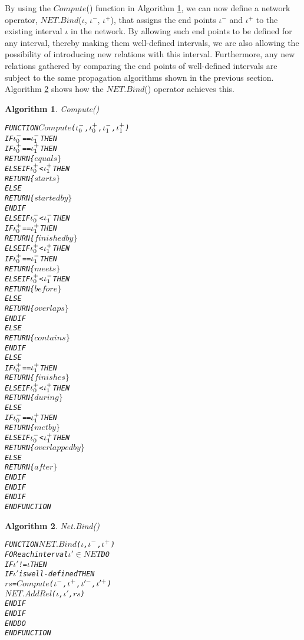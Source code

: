 \documentclass[11pt]{report}
\newenvironment{vverbatim}
{
  \begin{alltt}
}
{
    \vspace{-\baselineskip}
  \end{alltt}
}
\newtheorem{vvalgorithm}{Algorithm}[chapter]
\newenvironment{valgorithm}[2]
{
  \begin{vvalgorithm}{#1}
    \label{#2}
    \small
    \begin{vverbatim}
}
{
    \end{vverbatim}
  \end{vvalgorithm}
}
\begin{document}
        By using the $Compute$() function in Algorithm \ref{algo-tempo-compu},
        we can now define a network operator, $NET.Bind$($\iota$, $\iota^-$,
        $\iota^+$), that assigns the end points $\iota^-$ and $\iota^+$ to the
        existing interval $\iota$ in the network. By allowing such end points
        to be defined for any interval, thereby making them well-defined
        intervals, we are also allowing the possibility of introducing new
        relations with this interval. Furthermore, any new relations gathered
        by comparing the end points of well-defined intervals are subject to
        the same propagation algorithms shown in the previous section.
        Algorithm \ref{algo-tempo-ntbin} shows how the $NET.Bind$() operator
        achieves this.

        \begin{valgorithm}{Compute()}{algo-tempo-compu}
FUNCTION \(Compute\)(\(\iota\sb{0}\sp{-}\), \(\iota\sb{0}\sp{+}\), \(\iota\sb{1}\sp{-}\), \(\iota\sb{1}\sp{+}\))
  IF \(\iota\sb{0}\sp{-}\) == \(\iota\sb{1}\sp{-}\) THEN
    IF \(\iota\sb{0}\sp{+}\) == \(\iota\sb{1}\sp{+}\) THEN
      RETURN \{\(equals\}\)
    ELSE IF \(\iota\sb{0}\sp{+}\) < \(\iota\sb{1}\sp{+}\) THEN
      RETURN \{\(starts\}\)
    ELSE
      RETURN \{\(started by\}\)
    ENDIF
  ELSE IF \(\iota\sb{0}\sp{-}\) < \(\iota\sb{1}\sp{-}\) THEN
    IF \(\iota\sb{0}\sp{+}\) == \(\iota\sb{1}\sp{+}\) THEN
      RETURN \{\(finished by\}\)
    ELSE IF \(\iota\sb{0}\sp{+}\) < \(\iota\sb{1}\sp{+}\) THEN
      IF \(\iota\sb{0}\sp{+}\) == \(\iota\sb{1}\sp{-}\) THEN
        RETURN \{\(meets\}\)
      ELSE IF \(\iota\sb{0}\sp{+}\) < \(\iota\sb{1}\sp{-}\) THEN
        RETURN \{\(before\}\)
      ELSE
        RETURN \{\(overlaps\}\)
      ENDIF
    ELSE
      RETURN \{\(contains\}\)
    ENDIF
  ELSE
    IF \(\iota\sb{0}\sp{+}\) == \(\iota\sb{1}\sp{+}\) THEN
      RETURN \{\(finishes\}\)
    ELSE IF \(\iota\sb{0}\sp{+}\) < \(\iota\sb{1}\sp{+}\) THEN
      RETURN \{\(during\}\)
    ELSE
      IF \(\iota\sb{0}\sp{-}\) == \(\iota\sb{1}\sp{+}\) THEN
        RETURN \{\(met by\}\)
      ELSE IF \(\iota\sb{0}\sp{-}\) < \(\iota\sb{1}\sp{+}\) THEN
        RETURN \{\(overlapped by\}\)
      ELSE
        RETURN \{\(after\}\)
      ENDIF
    ENDIF
  ENDIF
ENDFUNCTION
        \end{valgorithm}

        \begin{valgorithm}{Net.Bind()}{algo-tempo-ntbin}
FUNCTION \(NET.Bind\)(\(\iota\), \(\iota\sp{-}\), \(\iota\sp{+}\))
  FOR each interval \(\iota'\) \(\in\) \(NET\) DO
    IF \(\iota'\) != \(\iota\) THEN
      IF \(\iota'\) is well-defined THEN
        \(rs\) = \(Compute\)(\(\iota\sp{-}\), \(\iota\sp{+}\), \(\iota'\sp{-}\), \(\iota'\sp{+}\))
        \(NET.AddRel\)(\(\iota\), \(\iota'\), \(rs\))
      ENDIF
    ENDIF
  ENDDO
ENDFUNCTION
        \end{valgorithm}
\end{document}
